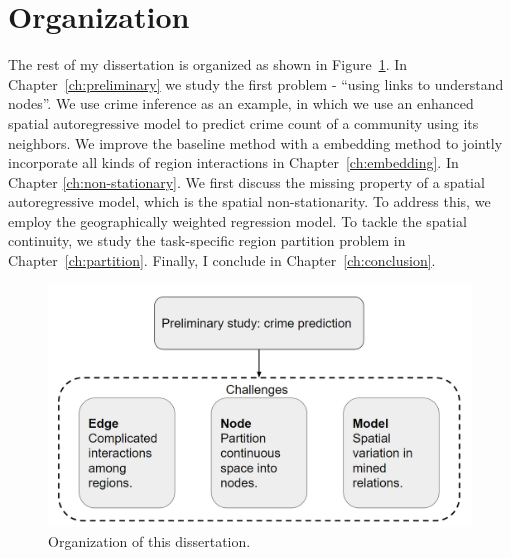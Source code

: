 \section{Organization}


The rest of my dissertation is organized as shown in Figure~\ref{fig:org}. In Chapter~\ref{ch:preliminary} we study the first problem - ``using links to understand nodes''. We use crime inference as an example, in which we use an enhanced spatial autoregressive model to predict crime count of a community using its neighbors. We improve the baseline method with a embedding method to jointly incorporate all kinds of region interactions in Chapter~\ref{ch:embedding}. In Chapter \ref{ch:non-stationary}. We first discuss the missing property of a spatial autoregressive model, which is the spatial non-stationarity. To address this, we employ the geographically weighted regression model. To tackle the spatial continuity, we study the task-specific region partition problem in Chapter~\ref{ch:partition}. Finally, I conclude in Chapter~\ref{ch:conclusion}.


\begin{figure}[h]
\centering
\includegraphics[width=\linewidth]{fig/organization.png}
\caption{Organization of this dissertation.}
\label{fig:org}
\end{figure}


